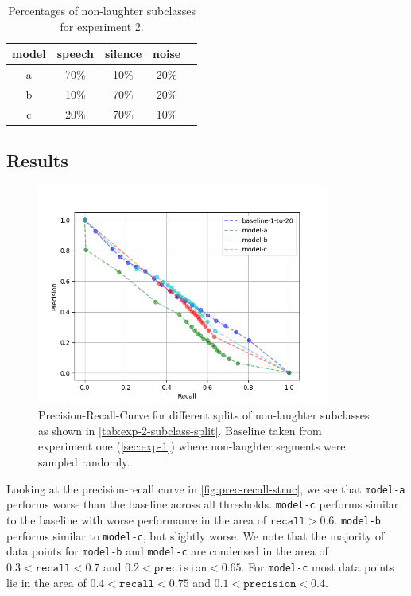 \documentclass[bsc,frontabs,parskip,deptreport]{infthesis}
\begin{document}
\begin{table}[h!]
    \centering
    \begin{tabular}{|c|c|c|c|c|}
        \hline
        model & speech & silence & noise \\
        \hline
        a &  70\% & 10\% & 20\% \\
        b &  10\%  & 70\% &  20\%\\
        c &  20\%  & 70\% & 10\% \\ 
        \hline
    \end{tabular}
    \caption{Percentages of non-laughter subclasses for experiment 2.}
    \label{tab:exp-2-subclass-split}
\end{table}

\subsection{Results}
\begin{figure}[h!]
    \centering
    \includegraphics[width = 3.8in]{imgs/prec-recall/exp2-structured/dev_compare_class_balance_dev_set.png}
    \caption{Precision-Recall-Curve for different splits of non-laughter subclasses as shown in \autoref{tab:exp-2-subclass-split}. Baseline taken from experiment one (\autoref{sec:exp-1}) where non-laughter segments were sampled randomly.}
    \label{fig:prec-recall-struc}
\end{figure}




Looking at the precision-recall curve in \autoref{fig:prec-recall-struc}, we see that \texttt{model-a} performs worse than the baseline across all thresholds. \texttt{model-c} performs similar to the baseline with worse performance in the area of $\mathtt{recall} > 0.6$. \texttt{model-b} performs similar to \texttt{model-c}, but slightly worse.
We note that the majority of data points for \texttt{model-b} and \texttt{model-c} are condensed in the area of $0.3 < \mathtt{recall} < 0.7$ and $0.2 < \mathtt{precision} < 0.65$. For \texttt{model-c} most data points lie in the area of $0.4 < \mathtt{recall} < 0.75$ and $0.1 < \mathtt{precision} < 0.4$.
\end{document}
